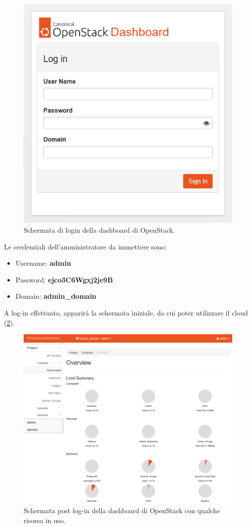 \begin{figure}[H]
    \centering
    \includegraphics[width=0.5\linewidth]{tesi/files/immagini/openstack/login.png}
    \caption{Schermata di login della dashboard di OpenStack.}
    \label{fig:openstack_login}
\end{figure}

\bigskip
Le credenziali dell'amministratore da immettere sono:
% 
\begin{itemize}
    \item[]Username: \textbf{admin}
    
    \item[]Password: \textbf{ejco3C6Wgxj2je9B}
    
    \item[]Domain: \textbf{admin\_domain}
\end{itemize}

\bigskip\noindent
A log-in effettuato, apparirà la schermata iniziale, da cui poter utilizzare il cloud (\cref{fig:openstack_dashboard}).

\begin{figure}[H]
    \centering
    \includegraphics[width=0.95\linewidth]{tesi/files/immagini/openstack/dashboard.png}
    \caption{Schermata post log-in della dashboard di OpenStack con qualche risorsa in uso.}
    \label{fig:openstack_dashboard}
\end{figure}
